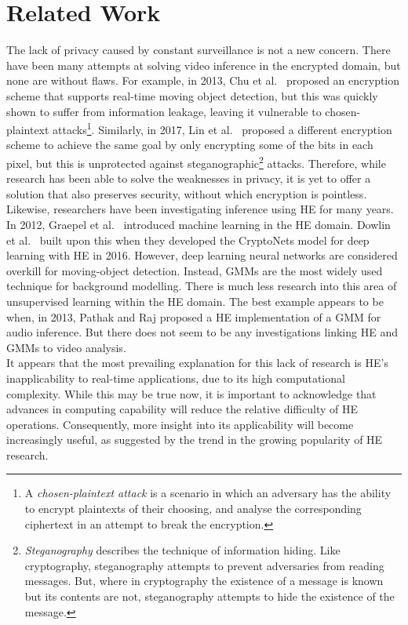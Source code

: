 \setlength{\leftskip}{0cm}


\section{Related Work}
\label{sec:relatedWork}
\setlength{\leftskip}{0.5cm}
\indent \indent
The lack of privacy caused by constant surveillance is not a new concern. There have been many attempts at solving video inference in the encrypted domain, but none are without flaws. For example, in 2013, Chu et al.\ \cite{Chu} proposed an encryption scheme that supports real-time moving object detection, but this was quickly shown to suffer from information leakage, leaving it vulnerable to chosen-plaintext attacks\footnote{A \textit{chosen-plaintext attack} is a scenario in which an adversary has the ability to encrypt plaintexts of their choosing, and analyse the corresponding ciphertext in an attempt to break the encryption. }. Similarly, in 2017, Lin et al.\ \cite{Lin} proposed a different encryption scheme to achieve the same goal by only encrypting some of the bits in each pixel, but this is unprotected against steganographic\footnote{\textit{Steganography} describes the technique of information hiding. Like cryptography, steganography attempts to prevent adversaries from reading messages. But, where in cryptography the existence of a message is known but its contents are not, steganography attempts to hide the existence of the message.} attacks. Therefore, while research has been able to solve the weaknesses in privacy, it is yet to offer a solution that also preserves security, without which encryption is pointless.
\smallskip \\ \indent
Likewise, researchers have been investigating inference using HE for many years. In 2012, Graepel et al.\ \cite{Graepel} introduced machine learning in the HE domain. Dowlin et al.\ \cite{Graepel} built upon this when they developed the CryptoNets model for deep learning with HE in 2016. However, deep learning neural networks are considered overkill for moving-object detection. Instead, GMMs are the most widely used technique for background modelling. There is much less research into this area of unsupervised learning within the HE domain. The best example appears to be when, in 2013, Pathak and Raj \cite{Pathak} proposed a HE implementation of a GMM for audio inference. But there does not seem to be any investigations linking HE and GMMs to video analysis.
\smallskip \\ \indent
It appears that the most prevailing explanation for this lack of research is HE's inapplicability to real-time applications, due to its high computational complexity. While this may be true now, it is important to acknowledge that advances in computing capability will reduce the relative difficulty of HE operations. Consequently, more insight into its applicability will become increasingly useful, as suggested by the trend in the growing popularity of HE research.

\setlength{\leftskip}{0cm}
